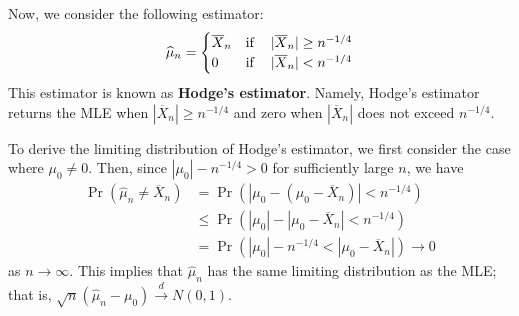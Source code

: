 \documentclass[10.5pt, A4paper, openany, uplatex]{book}
\renewcommand{\hat}{\widehat}
\renewcommand{\bar}{\overline}
\numberwithin{equation}{section}
\begin{document}
Now, we consider the following estimator:
\begin{align*}
	\hat \mu_n = \begin{cases}
		\bar X_n & \text{if \;\; $|\bar X_n| \ge n^{-1/4}$}\\
		0        & \text{if \;\; $|\bar X_n| < n^{-1/4}$}
	\end{cases}
\end{align*}
This estimator is known as \textbf{Hodge's estimator}.
Namely, Hodge's estimator returns the MLE when $|\bar X_n| \ge n^{-1/4}$ and zero when $|\bar X_n|$ does not exceed $n^{-1/4}$.

To derive the limiting distribution of Hodge's estimator, we first consider the case where $\mu_0 \neq 0$.
Then, since $|\mu_0| - n^{-1/4} > 0$ for sufficiently large $n$, we have
\begin{align*}
	\Pr(\hat \mu_n \neq \bar X_n) 
	& = \Pr(|\mu_0 - (\mu_0 - \bar X_n) | < n^{-1/4}) \\
	& \le \Pr(|\mu_0| - |\mu_0 - \bar X_n| < n^{-1/4}) \\
	& = \Pr(|\mu_0| - n^{-1/4} < |\mu_0 - \bar X_n|) \to 0
\end{align*}
as $n \to \infty$.
This implies that $\hat \mu_n$ has the same limiting distribution as the MLE; that is, $\sqrt{n}(\hat \mu_n - \mu_0) \overset{d}{\to} N(0, 1)$.
\end{document}
